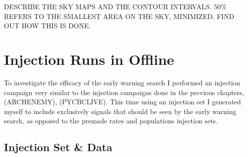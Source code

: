 DESCRIBE THE SKY MAPS AND THE CONTOUR INTERVALS. 50\% REFERS TO THE SMALLEST AREA ON THE SKY, MINIMIZED. FIND OUT HOW THIS IS DONE. 

\section{Injection Runs in Offline}

To investigate the efficacy of the early warning search I performed an injection campaign very similar to the injection campaigns done in the previous chapters, (ARCHENEMY), (PYCBCLIVE). This time using an injection set I generated myself to include exclusively signals that should be seen by the early warning search, as opposed to the premade rates and populations injection sets.

\subsection{Injection Set \& Data}

